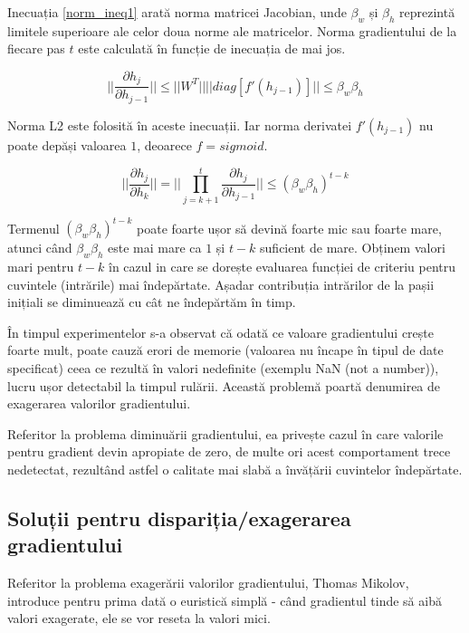Inecuația \ref{norm_ineq1} arată norma matricei Jacobian, unde $\beta_w$ și $\beta_h$ reprezintă limitele superioare ale celor doua norme ale matricelor. Norma gradientului de la fiecare pas $t$ este calculată în funcție de inecuația de mai jos.

\begin{equation}
	|| \frac{\partial h_j}{\partial h_{j-1}}|| \leq || W^T || || diag[f'(h_{j-1})]|| \leq \beta_w\beta_h
	\label{norm_ineq1}
\end{equation}

Norma L2 este folosită în aceste inecuații. Iar norma derivatei $f'(h_{j-1})$ nu poate depăși valoarea $1$, deoarece $f=sigmoid$.

\begin{equation}
	|| \frac{\partial h_j}{\partial h_k}|| = || \prod_{j=k+1}^{t} \frac{\partial h_j}{\partial h_{j-1}} || \leq (\beta_w\beta_h)^{t-k}
\end{equation}
 	
Termenul $(\beta_w\beta_h)^{t-k}$ poate foarte ușor să devină foarte mic sau foarte mare, atunci când $\beta_w\beta_h$ este mai mare ca $1$ și $t-k$ suficient de mare. Obținem valori mari pentru $t-k$ în cazul in care se dorește evaluarea funcției de criteriu pentru cuvintele (intrările) mai îndepărtate. Așadar contribuția intrărilor de la pașii inițiali se diminuează cu cât ne îndepărtăm în timp.

În timpul experimentelor s-a observat că odată ce valoare gradientului crește foarte mult, poate cauză erori de memorie (valoarea nu încape în tipul de date specificat) ceea ce rezultă în valori nedefinite (exemplu NaN (not a number)), lucru ușor detectabil la timpul rulării. Această problemă poartă denumirea de exagerarea valorilor gradientului.

Referitor la problema diminuării gradientului, ea privește cazul în care valorile pentru gradient devin apropiate de zero, de multe ori acest comportament trece nedetectat, rezultând astfel o calitate mai slabă a învățării cuvintelor îndepărtate.

\subsection{Soluții pentru dispariția/exagerarea gradientului}

Referitor la problema exagerării valorilor gradientului, Thomas Mikolov, introduce pentru prima dată o euristică simplă - când gradientul tinde să aibă valori exagerate, ele se vor reseta la valori mici.

